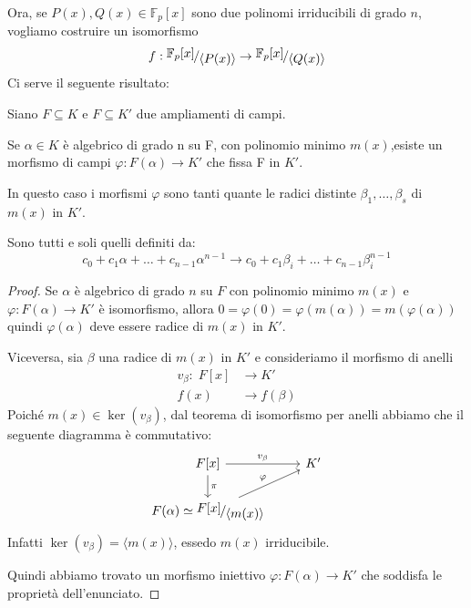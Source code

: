 \documentclass[../main.tex]{subfiles}
\begin{document}
Ora, se $P(x), Q(x) \in \mathbb{F}_p[x]$ sono due polinomi irriducibili di grado $n$, vogliamo costruire un isomorfismo
\begin{equation*}
    f: \nicefrac{\mathbb{F}_p[x]}{\langle P(x)\rangle} \rightarrow \nicefrac{\mathbb{F}_p[x]}{\langle Q(x)\rangle}
\end{equation*}
Ci serve il seguente risultato:

\begin{proposition}
    Siano $F \subseteq K$ e $F \subseteq K'$ due ampliamenti di campi.

    Se $\alpha \in K$ è algebrico di grado n su F, con polinomio minimo $m(x)$,esiste un morfismo di campi $\varphi : F(\alpha) \rightarrow K'$ che fissa F in $K'$.

    In questo caso i morfismi $\varphi$ sono tanti quante le radici distinte $\beta_1, \ldots ,\beta_s$ di $m(x)$ in $K'$.

    Sono tutti e soli quelli definiti da:
    \begin{equation*}
        c_0 + c_1\alpha + \ldots + c_{n-1}\alpha^{n-1} \rightarrow c_0 + c_1\beta_i + \ldots + c_{n-1}\beta_i^{n-1}
    \end{equation*}
\end{proposition}

\begin{proof}
    Se $\alpha$ è algebrico di grado $n$ su $F$ con polinomio minimo $m(x)$ e $\varphi : F(\alpha) \rightarrow K'$ è isomorfismo, allora $0 = \varphi(0) = \varphi(m(\alpha)) = m(\varphi(\alpha))$  quindi $\varphi(\alpha)$ deve essere radice di $m(x)$ in $K'$.

    Viceversa, sia $\beta$ una radice di $m(x)$ in $K'$ e consideriamo il morfismo di anelli
    \begin{align*}
        v_\beta : \; F[x] & \rightarrow K'       \\
        f(x)              & \rightarrow f(\beta)
    \end{align*}
    Poiché $m(x) \in \ker(v_\beta)$, dal teorema di isomorfismo per anelli abbiamo che il seguente diagramma è commutativo:
    \begin{equation*}
        \begin{tikzcd}
            F[x] \arrow{r}{v_\beta} \arrow{d}{\pi} & K'\\
            F(\alpha) \simeq \nicefrac{F[x]}{\langle m(x)\rangle} \arrow{ur}{\varphi}
        \end{tikzcd}
    \end{equation*}
    Infatti $\ker(v_\beta) = \langle m(x)\rangle$, essedo $m(x)$ irriducibile.

    Quindi abbiamo trovato un morfismo iniettivo $\varphi : F(\alpha) \rightarrow K'$ che soddisfa le proprietà dell'enunciato.
\end{proof}
\end{document}
